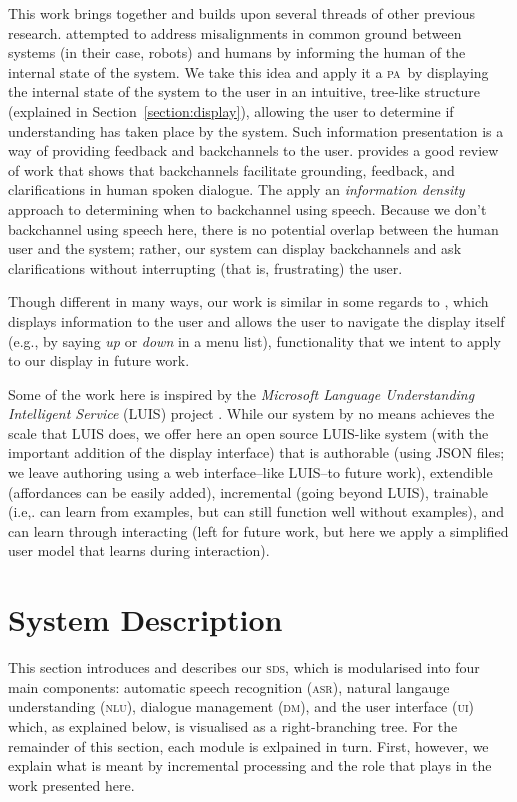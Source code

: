 \documentclass[11pt]{article}
\newcommand{\sds}[0]{\textsc{sds}}
\newcommand{\nlu}[0]{\textsc{nlu}}
\newcommand{\asr}[0]{\textsc{asr}}
\newcommand{\dm}[0]{\textsc{dm}}
\newcommand{\ui}[0]{\textsc{ui}}
\newcommand{\pa}[0]{\textsc{pa}}
\begin{document}
This work brings together and builds upon several threads of other previous research. \cite{Chai2014} attempted to address misalignments in common ground \cite{clarkschaefer:contrdis} between systems (in their case, robots) and humans by informing the human of the internal state of the system. We take this idea and apply it a \pa\ by displaying the internal state of the system to the user in an intuitive, tree-like structure (explained in Section~\ref{section:display}), allowing the user to determine if understanding has taken place by the system. Such information presentation is a way of providing feedback and backchannels to the user. \cite{Dethlefs2015} provides a good review of work that shows that backchannels facilitate grounding, feedback, and clarifications in human spoken dialogue. The apply an \emph{information density} approach to determining when to backchannel using speech. Because we don't backchannel using speech here, there is no potential overlap between the human user and the system; rather, our system can display backchannels and ask clarifications without interrupting (that is, frustrating) the user. 

Though different in many ways, our work is similar in some regards to \cite{Larsson2011}, which displays information to the user and allows the user to navigate the display itself (e.g., by saying \emph{up} or \emph{down} in a menu list), functionality that we intent to apply to our display in future work. 

Some of the work here is inspired by the \emph{Microsoft Language Understanding Intelligent Service} (LUIS) project \cite{Williams2015_sigdial}. While our system by no means achieves the scale that LUIS does, we offer here an open source LUIS-like system (with the important addition of the display interface) that is authorable (using JSON files; we leave authoring using a web interface--like LUIS--to future work), extendible (affordances can be easily added), incremental (going beyond LUIS), trainable (i.e,. can learn from examples, but can still function well without examples), and can learn through interacting (left for future work, but here we apply a simplified user model that learns during interaction). 

\section{System Description}
\label{section:system_def}

This section introduces and describes our \sds, which is modularised into four main components: automatic speech recognition (\asr), natural langauge understanding (\nlu), dialogue management (\dm), and the user interface (\ui) which, as explained below, is visualised as a right-branching tree. For the remainder of this section, each module is exlpained in turn. First, however, we explain what is meant by incremental processing and the role that plays in the work presented here. 
\end{document}
